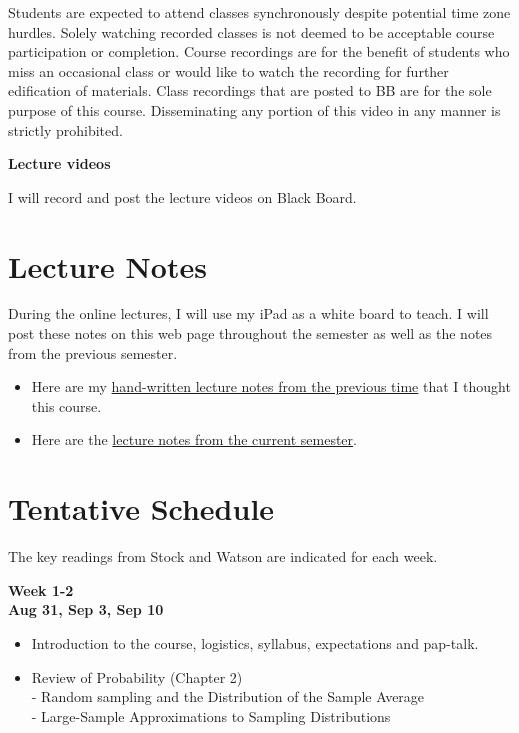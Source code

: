 \documentclass[
]{book}
\providecommand{\tightlist}{%
  \setlength{\itemsep}{0pt}\setlength{\parskip}{0pt}}
\begin{document}
Students are expected to attend classes synchronously despite potential time zone hurdles. Solely watching recorded classes is not deemed to be acceptable course participation or completion. Course recordings are for the benefit of students who miss an occasional class or would like to watch the recording for further edification of materials. Class recordings that are posted to BB are for the sole purpose of this course. Disseminating any portion of this video in any manner is strictly prohibited.

\textbf{Lecture videos}

I will record and post the lecture videos on Black Board.

\hypertarget{lecture-notes}{%
\section*{Lecture Notes}\label{lecture-notes}}

During the online lectures, I will use my iPad as a white board to teach. I will post these notes on this web page throughout the semester as well as the notes from the previous semester.

\begin{itemize}
\item
  Here are my \href{https://www.dropbox.com/s/kng2oynyxrtiir5/EC\%20282\%20SPRING\%202020.pdf?dl=0}{hand-written lecture notes from the previous time} that I thought this course.
\item
  Here are the \href{https://www.dropbox.com/s/e5c8qax19lkrrn3/EC\%20282\%20FALL\%202020.pdf?dl=0}{lecture notes from the current semester}.
\end{itemize}

\hypertarget{tentative-schedule}{%
\section*{Tentative Schedule}\label{tentative-schedule}}

The key readings from Stock and Watson are indicated for each week.

\textbf{Week 1-2}\\
\textbf{Aug 31, Sep 3, Sep 10}

\begin{itemize}
\tightlist
\item
  Introduction to the course, logistics, syllabus, expectations and pap-talk.\\
\item
  Review of Probability (Chapter 2)\\
  - Random sampling and the Distribution of the Sample Average\\
  - Large-Sample Approximations to Sampling Distributions
\end{itemize}
\end{document}
